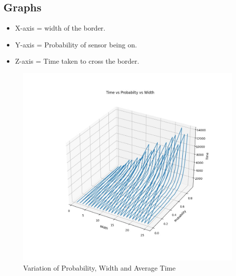 \documentclass[12pt]{article}
\begin{document}
    \subsection{Graphs}
        \begin{itemize}
        
            \item X-axis = width of the border.
            
            \item Y-axis = Probability of sensor being on.
            
            \item Z-axis = Time taken to cross the border.
        \end{itemize}
        
        
        \clearpage
        \begin{figure}[ht]
            \centering
            \caption{Variation of Probability, Width and Average Time}
            \includegraphics[scale = 0.81, width = 18.0 cm]{graph.jpg}
        \end{figure}
\end{document}
